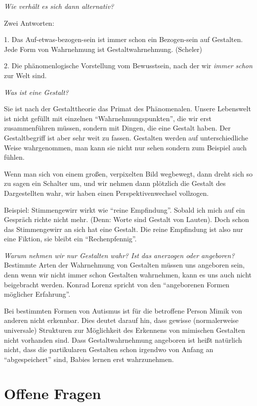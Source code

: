 \documentclass[a4paper, emulatestandardclasses]{scrartcl}
\begin{document}
\noindent \emph{Wie verhält es sich dann alternativ?} 

Zwei Antworten: 

1. Das Auf-etwas-bezogen-sein ist immer schon ein Bezogen-sein auf Gestalten. Jede Form von Wahrnehmung ist Gestaltwahrnehmung. (Scheler)

2. Die phänomenlogische Vorstellung vom Bewusstsein, nach der wir \emph{immer schon} zur Welt sind.\newline

\noindent \emph{Was ist eine Gestalt?}

Sie ist nach der Gestalttheorie das Primat des Phänomenalen. Unsere Lebenswelt ist nicht gefüllt mit einzelnen "`Wahrnehmungspunkten"', die wir erst zusammenführen müssen, sondern mit Dingen, die eine Gestalt haben. Der Gestaltbegriff ist aber sehr weit zu fassen. Gestalten werden auf unterschiedliche Weise wahrgenommen, man kann sie nicht nur sehen sondern zum Beispiel auch fühlen.

Wenn man sich von einem großen, verpixelten Bild wegbewegt, dann dreht sich so zu sagen ein Schalter um, und wir nehmen dann plötzlich die Gestalt des Dargestellten wahr, wir haben einen Perspektivenwechsel vollzogen.

Beispiel: Stimmengewirr wirkt wie "`reine Empfindung"'. Sobald ich mich auf ein Gespräch richte nicht mehr. (Denn: Worte sind Gestalt von Lauten). Doch schon das Stimmengewirr an sich hat eine Gestalt. Die reine Empfindung ist also nur eine Fiktion, sie bleibt ein "`Rechenpfennig"'.\newline


\noindent \emph{Warum nehmen wir nur Gestalten wahr? Ist das anerzogen oder angeboren?}
Bestimmte Arten der Wahrnehmung von Gestalten müssen uns angeboren sein, denn wenn wir nicht immer schon Gestalten wahrnehmen, kann es uns auch nicht beigebracht werden. Konrad Lorenz spricht von den "`angeborenen Formen möglicher Erfahrung"'.

Bei bestimmten Formen von Autismus ist für die betroffene Person Mimik von anderen nicht erkennbar. Dies deutet darauf hin, dass gewisse (normalerweise universale) Strukturen zur Möglichkeit des Erkennens von mimischen Gestalten nicht vorhanden sind. Dass Gestaltwahrnehmung angeboren ist heißt natürlich nicht, dass die partikularen Gestalten schon irgendwo von Anfang an "`abgespeichert"' sind, Babies lernen erst wahrzunehmen.



\section*{Offene Fragen}
\end{document}
